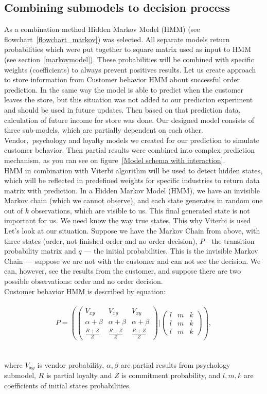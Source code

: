 \subsection{Combining submodels to decision process} \label{subsec:combining_models}
As a combination method Hidden Markov Model (HMM) (see flowchart~\ref{flowchart_markov}) was selected.
All separate models return probabilities which were put together to square matrix used as input to HMM (see section~\ref{markovmodel}).
These probabilities will be combined with specific weights (coefficients) to always prevent positives results.
Let us create approach to store information from Customer behavior HMM about successful order prediction.
In the same way the model is able to predict when the customer leaves the store, but this situation was not added to our prediction experiment and should be used in future updates.
Then based on that prediction data, calculation of future income for store was done.
Our designed model consists of three sub-models, which are partially dependent on each other.
Vendor,\ psychology and loyalty models we created for our prediction to simulate customer behavior.
Then partial results were combined into complex prediction mechanism, as you can see on figure~\ref{Model schema with interaction}.
\\
HMM in combination with Viterbi algorithm will be used to detect hidden states, which will be reflected in predefined weights for specific
industries to return data matrix with prediction.
In a Hidden Markov Model (HMM), we have an invisible Markov chain (which we cannot observe), and each state
generates in random one out of $k$ observations, which are visible to us.
This final generated state is not important for us.
We need know the way true states.
This why Viterbi is used
Let’s look at our situation.
Suppose we have the Markov Chain from above, with three states (order, not finished order and no order decision),
$P$ - the transition probability matrix and $q$ — the initial probabilities.
This is the invisible Markov Chain — suppose we are not with the customer and can not see the decision.
We can, however, see the results from the customer, and suppose there are two possible observations: order and no order decision.\\
Customer behavior HMM is described by equation:\\
\\
\begin{equation} \label{eq:25}
P = \left(
\begin{pmatrix}
    V_{xy} & V_{xy} & V_{xy} \\
    \alpha + \beta & \alpha + \beta & \alpha + \beta \\
    \frac{R + Z}{Z} & \frac{R + Z}{Z} & \frac{R + Z}{Z}
\end{pmatrix}|
\begin{pmatrix}
    l & m & k \\
    l & m & k \\
    l & m & k
\end{pmatrix}
\right),
\end{equation}\\
\\
where $V_{xy}$ is vendor probability, $\alpha, \beta$ are partial results from psychology submodel, $R$ is partial
loyalty and $Z$ is commitment probability, and $l,m,k$ are coefficients of initial states probabilities.
